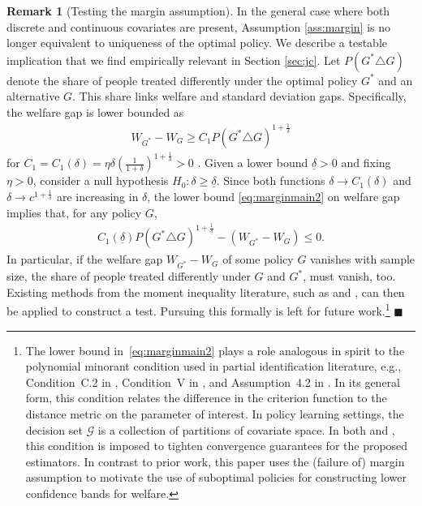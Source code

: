 \documentclass[12pt]{article}
\numberwithin{equation}{section}
\theoremstyle{plain}                         %
\theoremstyle{definition}                  %
\newtheorem{remark}{Remark}
\theoremstyle{remark}                      %
\renewcommand{\qed}{\hfill$\blacksquare$}
\begin{document}
\begin{remark}[Testing the margin assumption]
\label{rm:vanish}
In the general case where both discrete and continuous covariates are present,   Assumption \ref{ass:margin} is no longer equivalent to uniqueness of the optimal policy. 
We describe a testable implication that we find empirically relevant in Section \ref{sec:jc}.  Let $P(G^* \triangle G)$ denote the share of people treated differently under the optimal policy $G^*$ and an alternative $G$. This share links welfare and standard deviation gaps. Specifically, the welfare gap is lower bounded as 
\begin{align}
W_{G^*} - W_{G} \geq C_1P (G^{*} \triangle G)^{1+\frac{1}{\delta}}  \label{eq:marginmain2} 
\end{align}
for $C_1 = C_1(\delta)=\eta\delta(\frac{1}{1+\delta})^{1 + \frac{1}{\delta}} > 0$ \citep{Tsybakov}. Given a lower bound $\underline{\delta}>0$ and fixing $\eta>0$, consider  a null hypothesis  $H_0: \delta \geqslant \underline{\delta}$. Since both functions $\delta \rightarrow C_1(\delta)$ and $\delta \rightarrow  c^{1+\frac{1}{\delta}}$  are increasing in $\delta$, the lower bound \eqref{eq:marginmain2} on welfare gap implies that, for any policy $G$, 
\begin{align}
 C_1(\underline{\delta}) P(G^* \triangle G)^{1 + \frac{1}{\underline{\delta}}} - (W_{G^*} - W_G) \leq 0. \label{eq:marginmain3}
\end{align}
In particular, if the welfare gap $W_{G^*} - W_G$ of some policy $G$ vanishes with sample size, the share of people treated differently under $G$ and $G^*$, must vanish, too. Existing methods from the moment inequality literature, such as \citet{CLR} and \citet{CherNeweySantos}, can then be applied to construct a test. Pursuing this formally is left for future work.\footnote{The lower bound in~\eqref{eq:marginmain2} plays a role analogous in spirit to the polynomial minorant condition used in partial identification literature, e.g., Condition~C.2 in \citet{CHT}, Condition~V in \citet{CLR}, and Assumption~4.2 in \citet{Armstrong2014}. In its general form, this condition relates the difference in the criterion function to the distance metric on the parameter of interest.  In policy learning settings, the decision set $\mathcal{G}$ is a collection of partitions of covariate space.  In both \citet{CLR} and \citet{KitagawaTetenov}, this condition is imposed to tighten convergence guarantees for the proposed estimators.  In contrast to prior work, this paper uses the (failure of) margin assumption to motivate the use of suboptimal policies for constructing lower confidence bands for welfare. } \qed 
\end{remark}
\end{document}

